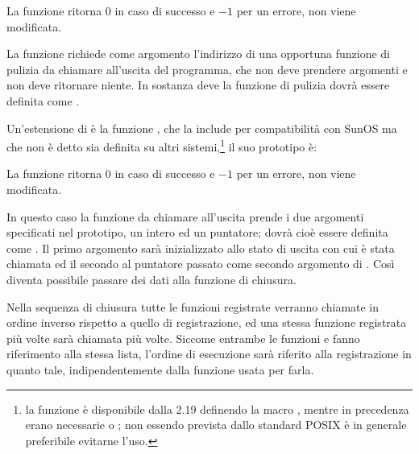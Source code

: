 \begin{funcproto}{ 
} 
{La funzione ritorna $0$ in caso di successo e $-1$ per un errore, 
  non viene modificata.}
\end{funcproto}

La funzione richiede come argomento  l'indirizzo di una
opportuna funzione di pulizia da chiamare all'uscita del programma, che non
deve prendere argomenti e non deve ritornare niente. In sostanza deve la
funzione di pulizia dovrà essere definita come .

Un'estensione di  è la funzione , che la
 include per compatibilità con SunOS ma che non è detto sia
definita su altri sistemi,\footnote{la funzione è disponibile dalla
   2.19 definendo la macro , mentre in
  precedenza erano necessarie  o ;
  non essendo prevista dallo standard POSIX è in generale preferibile evitarne
  l'uso.} il suo prototipo è:

\begin{funcproto}{ 
}
{La funzione ritorna $0$ in caso di successo e $-1$ per un errore, 
  non viene modificata.} 
\end{funcproto}

In questo caso la funzione da chiamare all'uscita prende i due argomenti
specificati nel prototipo, un intero ed un puntatore; dovrà cioè essere
definita come . Il primo argomento
sarà inizializzato allo stato di uscita con cui è stata chiamata 
ed il secondo al puntatore  passato come secondo argomento di
.  Così diventa possibile passare dei dati alla funzione di
chiusura.

Nella sequenza di chiusura tutte le funzioni registrate verranno chiamate in
ordine inverso rispetto a quello di registrazione, ed una stessa funzione
registrata più volte sarà chiamata più volte. Siccome entrambe le funzioni
 e  fanno riferimento alla stessa lista, l'ordine
di esecuzione sarà riferito alla registrazione in quanto tale,
indipendentemente dalla funzione usata per farla.

